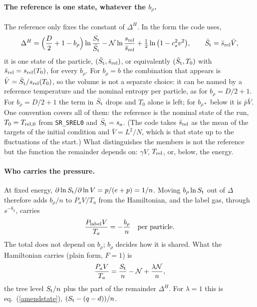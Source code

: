 \documentclass[11pt,aps,preprint,nofootinbib,superscriptaddress,tightenlines]{revtex4-2}
\def\st{\begin{equation}}
\def\stp{\end{equation}}
\def\Eq#1{eq.~(\ref{#1})}
\let\oldparagraph\paragraph
\renewcommand{\paragraph}{\par\bigskip\oldparagraph}
\begin{document}
\paragraph{The reference is one state, whatever the $b_\rho$.}  The reference only fixes the constant of $\Delta^H$.  In the form the code uses,
\st
\Delta^H=\Big(\frac D2+1-b_\rho\Big)\ln\frac{S_{\rm t}}{\bar S_{\rm t}}-\mathcal N\ln\frac{s_{\rm rel}}{\bar s_{\rm rel}}+\tfrac12\ln\big(1-c_s^2v^2\big),
\qquad \bar S_{\rm t}=\bar s_{\rm rel}\bar V,
\stp
it is one state of the particle, $(\bar S_{\rm t},\bar s_{\rm rel})$, or equivalently $(\bar S_{\rm t},T_0)$ with $\bar s_{\rm rel}=s_{\rm rel}(T_0)$,
for every $b_\rho$.  For $b_\rho=b$ the combination that appears is $\bar V=\bar S_{\rm t}/s_{\rm rel}(T_0)$, so the volume is not a separate choice: it
can be named by a reference temperature and the nominal entropy per particle, as for $b_\rho=D/2+1$.  For $b_\rho=D/2+1$ the term in $\bar S_{\rm t}$
drops and $T_0$ alone is left; for $b_{\rho*}$ below it is $\bar p\bar V$.  One convention covers all of them: the reference is the nominal state of the
run, $T_0=T_{\rm rel,0}$ from \texttt{SR\_SREL0} and $\bar S_{\rm t}=s_a$.  (The code takes $\bar s_{\rm rel}$ as the mean of the targets of the initial
condition and $\bar V=L^2/N$, which is that state up to the fluctuations of the start.)  What distinguishes the members is not the reference but the
function the remainder depends on: $\gamma V$, $T_{\rm rel}$, or, below, the energy.

\paragraph{Who carries the pressure.}  At fixed energy, $\partial\ln S_{\rm t}/\partial\ln V=p/(e+p)=1/n$.  Moving $b_\rho\ln S_{\rm t}$ out of $\Delta$
therefore adds $b_\rho/n$ to $P_aV/T_a$ from the Hamiltonian, and the label gas, through $s^{-b_\rho}$, carries
\st
\frac{P_{\rm label}V}{T_a}=-\frac{b_\rho} n\quad\text{per particle.}
\stp
The total does not depend on $b_\rho$; $b_\rho$ decides how it is shared.  What the Hamiltonian carries (plain form, $F=1$) is
\st
\frac{P_aV}{T_a}=\frac{S_{\rm t}}n-\mathcal N+\frac{\lambda\mathcal N}n ,
\label{betapressure}
\stp
the tree level $S_{\rm t}/n$ plus the part of the remainder $\Delta^H$.  For $\lambda=1$ this is \Eq{amendstate}, $(S_{\rm t}-(q-d))/n$.
\end{document}

